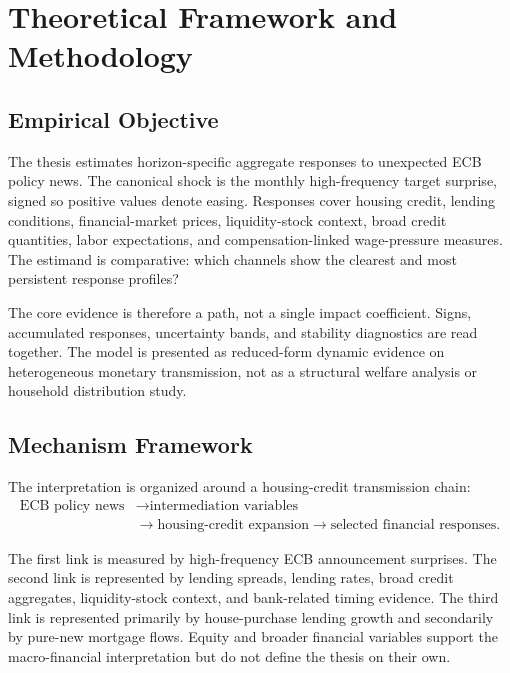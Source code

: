 \chapter{Theoretical Framework and Methodology}
\label{chap:theory}
\label{chap:methodology}

\section{Empirical Objective}

The thesis estimates horizon-specific aggregate responses to unexpected ECB policy news. The canonical shock is the monthly high-frequency target surprise, signed so positive values denote easing. Responses cover housing credit, lending conditions, financial-market prices, liquidity-stock context, broad credit quantities, labor expectations, and compensation-linked wage-pressure measures. The estimand is comparative: which channels show the clearest and most persistent response profiles?

The core evidence is therefore a path, not a single impact coefficient. Signs, accumulated responses, uncertainty bands, and stability diagnostics are read together. The model is presented as reduced-form dynamic evidence on heterogeneous monetary transmission, not as a structural welfare analysis or household distribution study.

\section{Mechanism Framework}

The interpretation is organized around a housing-credit transmission chain:
\begin{equation}
\begin{aligned}
  \text{ECB policy news}
  &\rightarrow
  \text{intermediation variables} \\
  &\rightarrow
  \text{housing-credit expansion}
  \rightarrow
  \text{selected financial responses}.
\end{aligned}
\label{eq:mechanism-chain}
\end{equation}

The first link is measured by high-frequency ECB announcement surprises. The second link is represented by lending spreads, lending rates, broad credit aggregates, liquidity-stock context, and bank-related timing evidence. The third link is represented primarily by house-purchase lending growth and secondarily by pure-new mortgage flows. Equity and broader financial variables support the macro-financial interpretation but do not define the thesis on their own.

